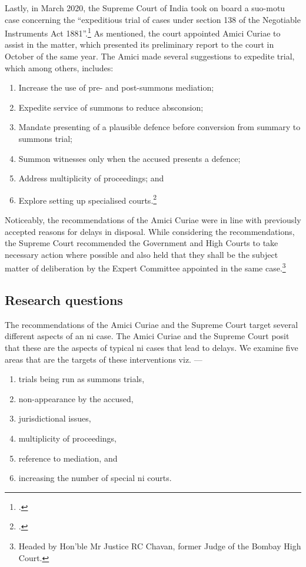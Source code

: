 Lastly, in March 2020, the Supreme Court of India took on board a suo-motu case concerning the “expeditious trial of cases under section 138 of the Negotiable Instruments Act 1881”.\footcite{sc2020_138} As mentioned, the court appointed Amici Curiae to assist in the matter, which presented its preliminary report to the court in October of the same year. The Amici made several suggestions to expedite trial, which among others, includes:

\begin{enumerate}[label=(\alph*)]
 \item Increase the use of pre- and post-summons mediation;
 \item Expedite service of summons to reduce absconsion;
 \item Mandate presenting of a plausible defence before conversion from summary to summons trial;
 \item Summon witnesses only when the accused presents a defence;
 \item Address multiplicity of proceedings; and
 \item Explore setting up specialised courts.\footcite{amicus2020_submission}
\end{enumerate}

Noticeably, the recommendations of the Amici Curiae were in line with previously accepted reasons for delays in disposal. While considering the recommendations, the Supreme Court recommended the Government and High Courts to take necessary action where possible and also held that they shall be the subject matter of deliberation by the Expert Committee appointed in the same case.\footnote{Headed by Hon’ble Mr Justice RC Chavan, former Judge of the Bombay High Court.}

\subsection{Research questions}
\label{sec:research-questions}

The recommendations of the Amici Curiae and the Supreme Court target several different aspects of an \gls{ni} case. The Amici Curiae and the Supreme Court posit that these are the aspects of typical \gls{ni} cases that lead to delays. We examine five areas that are the targets of these interventions viz. ---
\begin{enumerate}
\item trials being run as summons trials, 
\item non-appearance by the accused, 
\item jurisdictional issues, 
\item multiplicity of proceedings,
\item reference to mediation, and
\item increasing the number of special \gls{ni} courts.
\end{enumerate}

